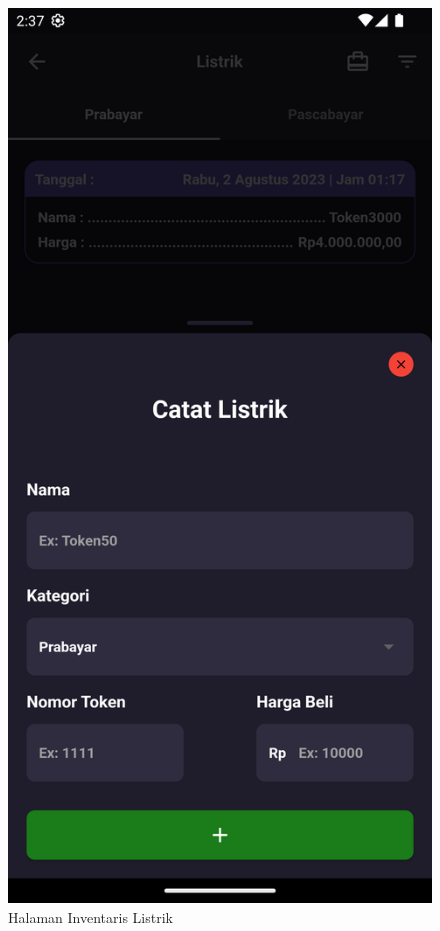 \begin{spacing}{1.5}
\begin{enumerate}
\begin{enumerate}
\begin{itemize}
\begin{figure}[H]
						\caption{Halaman Inventaris Listrik}
					\endminipage\hfill
						\includegraphics[width=\linewidth]{gambar/sprint4/el_2.png}

\end{figure}
\end{itemize}
\end{enumerate}
\end{enumerate}
\end{spacing}
